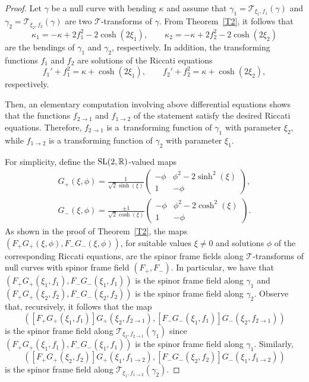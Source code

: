 \documentclass[pdftex]{sigma}
\numberwithin{equation}{section}
\def\bending{\kappa}
\def\R{\mathbb{R}}
\def\SL{{\rm SL}(2,\R)}
\begin{document}
\begin{proof} Let $\gamma$ be a null curve with bending $\bending$ and assume that $\gamma_1=\mathcal{T}_{\xi_1,f_1}(\gamma)$ and $\gamma_2=\mathcal{T}_{\xi_2,f_2}(\gamma)$ are two $\mathcal{T}$-transforms of $\gamma$. From Theorem~\ref{T2}, it follows that
	\begin{equation*}
		\bending_1=-\bending+2f_1^2-2\cosh(2\xi_1),\qquad
		\bending_2=-\bending+2f_2^2-2\cosh(2\xi_2)
	\end{equation*}
	are the bendings of $\gamma_1$ and $\gamma_2$, respectively. In addition, the transforming functions $f_1$ and $f_2$ are solutions of the Riccati equations
	\begin{equation*}
		f_1'+f_1^2=\bending+\cosh(2\xi_1),\qquad
		f_2'+f_2^2=\bending+\cosh(2\xi_2),
	\end{equation*}	
	respectively.
	
	Then, an elementary computation involving above differential equations shows that the functions $f_{2\to1}$ and $f_{1\to 2}$ of the statement satisfy the desired Riccati equations. Therefore, $f_{2\to 1}$ is a~transforming function of $\gamma_1$ with parameter $\xi_2$, while $f_{1\to 2}$ is a transforming function of $\gamma_2$ with parameter $\xi_1$.
	
	For simplicity, define the $\SL$-valued maps
	\begin{gather*}
		G_+(\xi,\phi)=\frac{1}{\sqrt{2}\sinh(\xi)}\begin{pmatrix} -\phi & \phi^2-2\sinh^2(\xi) \\ 1 & -\phi \end{pmatrix},\\
		G_-(\xi,\phi)=\frac{\pm1}{\sqrt{2}\cosh(\xi)}\begin{pmatrix} -\phi & \phi^2-2\cosh^2(\xi) \\ 1 & -\phi \end{pmatrix}.
	\end{gather*}
	As shown in the proof of Theorem~\ref{T2}, the maps $(F_+G_+(\xi,\phi),F_-G_-(\xi,\phi))$, for suitable values $\xi\neq 0$ and solutions $\phi$ of the corresponding Riccati equations, are the spinor frame fields along $\mathcal{T}$-transforms of null curves with spinor frame field $(F_+,F_-)$. In particular, we have that $(F_+G_+(\xi_1,f_1),F_-G_-(\xi_1,f_1))$ is the spinor frame field along $\gamma_1$ and $(F_+G_+(\xi_2,f_2),F_-G_-(\xi_2,f_2))$ is the spinor frame field along $\gamma_2$. Observe that, recursively, it follows that the map
	\begin{equation*}([F_+G_+(\xi_1,f_1)]G_+(\xi_2,f_{2\to 1}),[F_-G_-(\xi_1,f_1)]G_-(\xi_2,f_{2\to 1}))\end{equation*}
	is the spinor frame field along $\mathcal{T}_{\xi_2,f_{2\to 1}}(\gamma_1)$ since $(F_+G_+(\xi_1,f_1),F_-G_-(\xi_1,f_1))$ is the spinor frame field along $\gamma_1$. Similarly,
	\begin{equation*}([F_+G_+(\xi_2,f_2)]G_+(\xi_1,f_{1\to 2}),[F_-G_-(\xi_2,f_2)]G_-(\xi_1,f_{1\to 2}))\end{equation*}
	is the spinor frame field along $\mathcal{T}_{\xi_1,f_{1\to 2}}(\gamma_2)$.
	

\end{proof}
\end{document}
